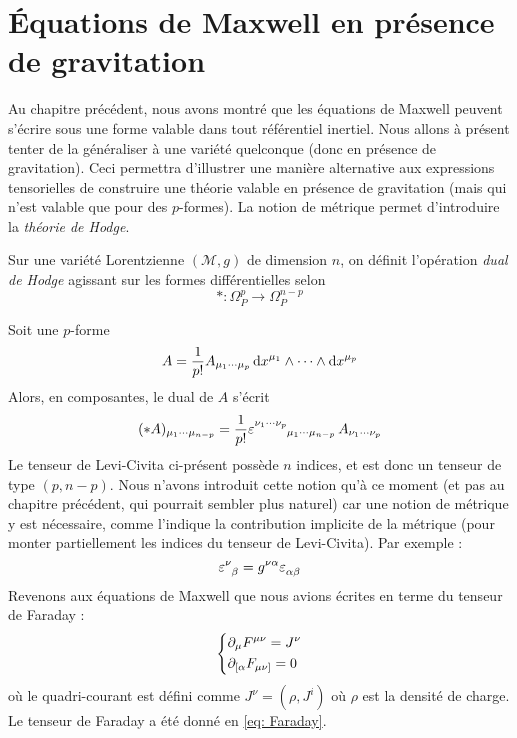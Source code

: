 \section{Équations de Maxwell en présence de gravitation}
Au chapitre précédent, nous avons montré que les équations de Maxwell peuvent s'écrire sous une forme valable dans tout référentiel inertiel. Nous allons à présent tenter de la généraliser à une variété quelconque (donc en présence de gravitation). Ceci permettra d'illustrer une manière alternative aux expressions tensorielles de construire une théorie valable en présence de gravitation (mais qui n'est valable que pour des $p$-formes). La notion de métrique permet d'introduire la \emph{théorie de Hodge}.

\begin{theoremframe}
    \begin{defi}
        Sur une variété Lorentzienne $(\mathcal{M},g)$ de dimension $n$, on définit l'opération \textit{dual de Hodge} agissant sur les formes différentielles selon
        \begin{equation}
            * : \Omega^{p}_{P} \rightarrow \Omega^{n-p}_{P}
        \end{equation}
    \end{defi}
\end{theoremframe}
Soit une $p$-forme
\begin{equation}
    A = \frac{1}{p!}A_{\mu_1 \cdots \mu_p}\,\mathrm{d} x^{\mu_1}\wedge \cdots \wedge \mathrm{d} x^{\mu_p}
\end{equation}
Alors, en composantes, le dual de $A$ s'écrit
\begin{equation}
    (*A)_{\mu_1 \cdots \mu_{n-p}} =  \frac{1}{p!}\varepsilon\indices{^{\nu_1 \cdots \nu_{p}}_{\mu_1 \cdots \mu_{n-p}}}\,A_{\nu_1 \cdots \nu_p}
\end{equation}
Le tenseur de Levi-Civita ci-présent possède $n$ indices, et est donc un tenseur de type $(p,n-p)$. Nous n'avons introduit cette notion qu'à ce moment (et pas au chapitre précédent, qui pourrait sembler plus naturel) car une notion de métrique y est nécessaire, comme l'indique la contribution implicite de la métrique (pour monter partiellement les indices du tenseur de Levi-Civita). Par exemple :
\begin{equation}
    \varepsilon\indices{^\nu_\beta} = g^{\nu \alpha} \varepsilon\indices{_\alpha_\beta}
\end{equation}
Revenons aux équations de Maxwell que nous avions écrites en terme du tenseur de Faraday :
\begin{equation}
\label{eq:maxwell4}
    \begin{dcases}
        \partial_{\mu}F^{\mu \nu} = J^{\nu}\\
        \partial_{[{\alpha}}F_{\mu \nu]} = 0
    \end{dcases}
\end{equation}
où le quadri-courant est défini comme $J^{\nu} = (\rho ,J^{i})$ où $\rho$ est la densité de charge. Le tenseur de Faraday a été donné en \ref{eq: Faraday}.

